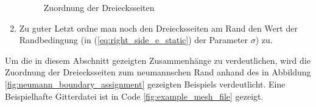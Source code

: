 \begin{enumerate}
\begin{figure}[H]
\begin{center}
		\end{center}
		\caption{Zuordnung der Dreiecksseiten}
		\label{fig:triangle_side_assignment}
	\end{figure}
	\item Zu guter Letzt ordne man noch den Dreiecksseiten am Rand den Wert der Randbedingung (in (\ref{eq:right_side_e_static}) der Parameter $\sigma$) zu.
\end{enumerate}

Um die in diesem Abschnitt gezeigten Zusammenhänge zu verdeutlichen, wird die Zuordnung der Dreiecksseiten zum neumannschen Rand anhand des in Abbildung \ref{fig:neumann_boundary_assignment} gezeigten Beispiels verdeutlicht. Eine Beispielhafte Gitterdatei ist in Code \ref{fig:example_mesh_file} gezeigt.



